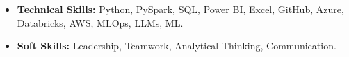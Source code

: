 \begin{itemize}[leftmargin=*]
  \item \textbf{Technical Skills:} Python, PySpark, SQL, Power BI, Excel, GitHub, Azure, Databricks, AWS, MLOps, LLMs, ML.
  \item \textbf{Soft Skills:} Leadership, Teamwork, Analytical Thinking, Communication.
\end{itemize}
